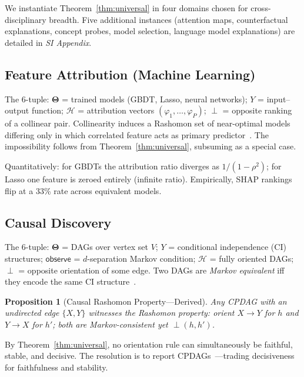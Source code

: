 \documentclass[twocolumn]{article}
\newtheorem{proposition}{Proposition}
\newcommand{\Params}{\mathbf{\Theta}}
\newcommand{\sH}{\mathcal{H}}
\newcommand{\incomp}{\perp}
\begin{document}
We instantiate Theorem~\ref{thm:universal} in four domains chosen for
cross-disciplinary breadth. Five additional instances (attention maps,
counterfactual explanations, concept probes, model selection, language
model explanations) are detailed in \emph{SI Appendix}.

\subsection{Feature Attribution (Machine Learning)}
\label{sec:instance-attr}

The 6-tuple: $\Params$ = trained models (GBDT, Lasso, neural networks); $Y$ = input--output function; $\sH$ = attribution vectors $(\varphi_1,\ldots,\varphi_P)$; $\incomp$ = opposite ranking of a collinear pair. Collinearity induces a Rashomon set of near-optimal models differing only in which correlated feature acts as primary predictor~\cite{damour2022underspecification,fisher2019models}. The impossibility follows from Theorem~\ref{thm:universal}, subsuming \cite{bilodeau2024impossibility} as a special case.

Quantitatively: for GBDTs the attribution ratio diverges as $1/(1-\rho^2)$; for Lasso one feature is zeroed entirely (infinite ratio). Empirically, SHAP rankings flip at a 33\% rate across equivalent models.

\subsection{Causal Discovery}
\label{sec:instance-causal}

The 6-tuple: $\Params$ = DAGs over vertex set $V$; $Y$ = conditional independence (CI) structures; $\mathsf{observe}$ = $d$-separation Markov condition; $\sH$ = fully oriented DAGs; $\incomp$ = opposite orientation of some edge. Two DAGs are \emph{Markov equivalent} iff they encode the same CI structure~\cite{verma1991equivalence}.

\begin{proposition}[Causal Rashomon Property---Derived]
\label{prop:causal-rashomon}
Any CPDAG with an undirected edge $\{X,Y\}$ witnesses the Rashomon property: orient $X\to Y$ for $h$ and $Y\to X$ for $h'$; both are Markov-consistent yet $\incomp(h,h')$.
\end{proposition}

By Theorem~\ref{thm:universal}, no orientation rule can simultaneously be faithful, stable, and decisive. The resolution is to report CPDAGs~\cite{chickering2002optimal}---trading decisiveness for faithfulness and stability.
\end{document}
